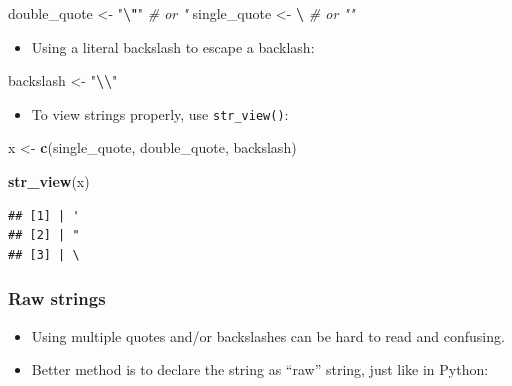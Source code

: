 \documentclass[
]{article}
\newenvironment{Shaded}{\begin{snugshade}}{\end{snugshade}}
\newcommand{\CommentTok}[1]{\textcolor[rgb]{0.56,0.35,0.01}{\textit{#1}}}
\newcommand{\FunctionTok}[1]{\textcolor[rgb]{0.13,0.29,0.53}{\textbf{#1}}}
\newcommand{\NormalTok}[1]{#1}
\newcommand{\OtherTok}[1]{\textcolor[rgb]{0.56,0.35,0.01}{#1}}
\newcommand{\SpecialCharTok}[1]{\textcolor[rgb]{0.81,0.36,0.00}{\textbf{#1}}}
\newcommand{\StringTok}[1]{\textcolor[rgb]{0.31,0.60,0.02}{#1}}
\providecommand{\tightlist}{%
  \setlength{\itemsep}{0pt}\setlength{\parskip}{0pt}}
\begin{document}
\begin{Shaded}
\begin{Highlighting}[]
\NormalTok{double\_quote }\OtherTok{\textless{}{-}} \StringTok{"}\SpecialCharTok{\textbackslash{}"}\StringTok{"} \CommentTok{\# or \textquotesingle{}"\textquotesingle{}}
\NormalTok{single\_quote }\OtherTok{\textless{}{-}} \StringTok{\textquotesingle{}}\SpecialCharTok{\textbackslash{}\textquotesingle{}}\StringTok{\textquotesingle{}} \CommentTok{\# or "\textquotesingle{}"}
\end{Highlighting}
\end{Shaded}

\begin{itemize}
\tightlist
\item
  Using a literal backslash to escape a backlash:
\end{itemize}

\begin{Shaded}
\begin{Highlighting}[]
\NormalTok{backslash }\OtherTok{\textless{}{-}} \StringTok{"}\SpecialCharTok{\textbackslash{}\textbackslash{}}\StringTok{"}
\end{Highlighting}
\end{Shaded}

\begin{itemize}
\tightlist
\item
  To view strings properly, use \texttt{str\_view()}:
\end{itemize}

\begin{Shaded}
\begin{Highlighting}[]
\NormalTok{x }\OtherTok{\textless{}{-}} \FunctionTok{c}\NormalTok{(single\_quote, double\_quote, backslash)}

\FunctionTok{str\_view}\NormalTok{(x)}
\end{Highlighting}
\end{Shaded}

\begin{verbatim}
## [1] | '
## [2] | "
## [3] | \
\end{verbatim}

\subsubsection{Raw strings}\label{raw-strings}

\begin{itemize}
\tightlist
\item
  Using multiple quotes and/or backslashes can be hard to read and
  confusing.\\
\item
  Better method is to declare the string as ``raw'' string, just like in
  Python:
\end{itemize}
\end{document}
